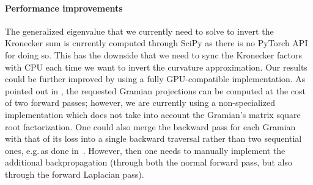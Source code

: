 \paragraph{Performance improvements} The generalized eigenvalue that we currently need to solve to invert the Kronecker sum is currently computed through SciPy as there is no PyTorch API for doing so. This has the downside that we need to sync the Kronecker factors with CPU each time we want to invert the curvature approximation. Our results could be further improved by using a fully GPU-compatible implementation.
As pointed out in \citep{martens2015optimizing}, the requested Gramian projections can be computed at the cost of two forward passes; however, we are currently using a non-specialized implementation which does not take into account the Gramian's matrix square root factorization.
One could also merge the backward pass for each Gramian with that of its loss into a single backward traversal rather than two sequential ones, e.g.\,as done in~\cite{dangel2020backpack}.
However, then one needs to manually implement the additional backpropagation (through both the normal forward pass, but also through the forward Laplacian pass).







